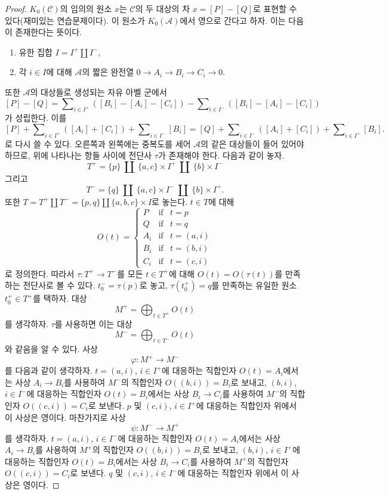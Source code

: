 \begin{proof}
\medskip\noindent
$K_0(\mathcal{C})$의 임의의 원소 $x$는 $\mathcal{C}$의 두 대상의
차 $x = [P] - [Q]$로 표현할 수 있다(재미있는 연습문제이다).
이 원소가 $K_0(\mathcal{A})$에서 영으로 간다고 하자.
이는 다음이 존재한다는 뜻이다.
\begin{enumerate}
\item 유한 집합 $I = I^{+} \amalg I^{-}$,
\item 각 $i \in I$에 대해 $\mathcal{A}$의 짧은 완전열
$0 \to A_i \to B_i \to C_i \to 0$.
\end{enumerate}
또한 $\mathcal{A}$의 대상들로 생성되는 자유 아벨 군에서
$$
[P] - [Q] =
\sum\nolimits_{i \in I^{+}} ([B_i] - [A_i] - [C_i])
-
\sum\nolimits_{i \in I^{-}} ([B_i] - [A_i] - [C_i])
$$
가 성립한다. 이를
$$
[P]
+ \sum\nolimits_{i \in I^{+}} ([A_i] + [C_i])
+ \sum\nolimits_{i \in I^{-}} [B_i]
=
[Q]
+ \sum\nolimits_{i \in I^{-}} ([A_i] + [C_i])
+ \sum\nolimits_{i \in I^{+}} [B_i].
$$
로 다시 쓸 수 있다. 오른쪽과 왼쪽에는 중복도를 세어
$\mathcal{A}$의 같은 대상들이 들어 있어야 하므로, 위에 나타나는
항들 사이에 전단사 $\tau$가 존재해야 한다. 다음과 같이 놓자.
$$
T^{+} =
\{p\}\ \amalg\ \{a, c\} \times I^{+}\ \amalg\ \{b\} \times I^{-}
$$
그리고
$$
T^{-} =
\{q\}\ \amalg\ \{a, c\} \times I^{-}\ \amalg\ \{b\} \times I^{+}.
$$
또한
$T = T^{+} \amalg T^{-} = \{p, q\} \amalg \{a, b, c\} \times I$로
놓는다. $t \in T$에 대해
$$
O(t)
=
\left\{
\begin{matrix}
P & \text{if} & t = p \\
Q & \text{if} & t = q \\
A_i & \text{if} & t = (a, i) \\
B_i & \text{if} & t = (b, i) \\
C_i & \text{if} & t = (c, i)
\end{matrix}
\right.
$$
로 정의한다. 따라서 $\tau : T^{+} \to T^{-}$를 모든
$t \in T^{+}$에 대해 $O(t) = O(\tau(t))$를 만족하는 전단사로 볼 수
있다. $t^{-}_0 = \tau(p)$로 놓고, $\tau(t^{+}_0) = q$를 만족하는
유일한 원소 $t^{+}_0 \in T^{+}$를 택하자. 대상
$$
M^{+} = \bigoplus\nolimits_{t \in T^{+}} O(t)
$$
를 생각하자. $\tau$를 사용하면 이는 대상
$$
M^{-} = \bigoplus\nolimits_{t \in T^{-}} O(t)
$$
와 같음을 알 수 있다. 사상
$$
\varphi : M^{+} \longrightarrow M^{-}
$$
를 다음과 같이 생각하자. $t = (a, i)$, $i \in I^{+}$에 대응하는
직합인자 $O(t) = A_i$에서는 사상 $A_i \to B_i$를 사용하여
$M^{-}$의 직합인자 $O((b, i)) = B_i$로 보내고,
$(b, i)$, $i \in I^{-}$에 대응하는 직합인자 $O(t) = B_i$에서는
사상 $B_i \to C_i$를 사용하여 $M^{-}$의 직합인자
$O((c, i)) = C_i$로 보낸다. $p$ 및 $(c, i)$, $i \in I^{+}$에
대응하는 직합인자 위에서 이 사상은 영이다.
마찬가지로 사상
$$
\psi : M^{-} \longrightarrow M^{+}
$$
를 생각하자. $t = (a, i)$, $i \in I^{-}$에 대응하는 직합인자
$O(t) = A_i$에서는 사상 $A_i \to B_i$를 사용하여 $M^{+}$의
직합인자 $O((b, i)) = B_i$로 보내고,
$(b, i)$, $i \in I^{+}$에 대응하는 직합인자 $O(t) = B_i$에서는
사상 $B_i \to C_i$를 사용하여 $M^{+}$의 직합인자
$O((c, i)) = C_i$로 보낸다. $q$ 및 $(c, i)$, $i \in I^{-}$에
대응하는 직합인자 위에서 이 사상은 영이다.


\end{proof}

